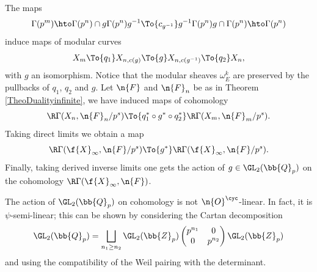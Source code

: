 The maps
\[
\Gamma(p^m)\hto \Gamma(p^n)\cap g\Gamma(p^n)g^{-1}\To{c_{g^{-1}}} g^{-1}\Gamma(p^n)g \cap \Gamma(p^n)\hto \Gamma(p^n)
\]
induce maps of modular curves
\[
X_m \To{q_1} X_{n,c(g)} \To{g} X_{n,c(g^{-1})} \To{q_2} X_{n},
\]
with $g$ an isomorphism. Notice that the modular sheaves $\omega^k_E$ are preserved by the pullbacks of $q_1$, $q_2$ and $g$. Let $\n{F}$ and $\n{F}_n$ be as in Theorem \ref{TheoDualityinfinite}, we have induced maps of cohomology
\[
\R\Gamma(X_n, \n{F}_n/p^s) \To{ q_1^* \circ g^*\circ q_2^*} \R\Gamma(X_{m}, \n{F}_m/p^s).
\]
Taking direct limits we obtain a map
\[
\R\Gamma(\f{X}_{\infty}, \n{F}/p^s)\To{g^*} \R\Gamma(\f{X}_{\infty}, \n{F}/p^s).
\]
Finally, taking derived inverse limits one gets the action of $g\in \GL_2(\bb{Q}_p)$ on the cohomology $\R\Gamma(\f{X}_{\infty}, \n{F})$.

The action of $\GL_2(\bb{Q}_p)$ on cohomology is not $\n{O}^{\cyc}$-linear. In fact, it is $\psi$-semi-linear; this can be shown by considering the Cartan decomposition
\[\GL_2(\bb{Q}_p)= \bigsqcup_{\substack{n_1 \geq n_2 }} \GL_2(\bb{Z}_p) \left(\begin{matrix} p^{n_1} & 0 \\ 0 & p^{n_2} \end{matrix} \right) \GL_2(\bb{Z}_p)
\]
and using the compatibility of the Weil pairing with the determinant.

